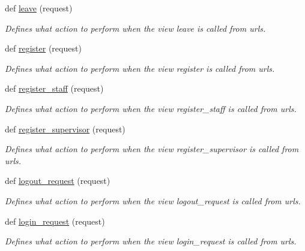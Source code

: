 \begin{DoxyCompactItemize}
def \hyperlink{namespacemain_1_1views_a0e05992f5c64ffb3cd35ddc581399e31}{leave} (request)
\begin{DoxyCompactList}\small\item\em Defines what action to perform when the view \textquotesingle{}leave\textquotesingle{} is called from urls. \end{DoxyCompactList}\item 
def \hyperlink{namespacemain_1_1views_a36b45d6ab9335da129aeab31c613726a}{register} (request)
\begin{DoxyCompactList}\small\item\em Defines what action to perform when the view \textquotesingle{}register\textquotesingle{} is called from urls. \end{DoxyCompactList}\item 
def \hyperlink{namespacemain_1_1views_afa83b35a6a0c354a6d9878bc3584aae4}{register\+\_\+staff} (request)
\begin{DoxyCompactList}\small\item\em Defines what action to perform when the view \textquotesingle{}register\+\_\+staff\textquotesingle{} is called from urls. \end{DoxyCompactList}\item 
def \hyperlink{namespacemain_1_1views_a26d1574cf1c0681b1589baf8f2840e4a}{register\+\_\+supervisor} (request)
\begin{DoxyCompactList}\small\item\em Defines what action to perform when the view \textquotesingle{}register\+\_\+supervisor\textquotesingle{} is called from urls. \end{DoxyCompactList}\item 
def \hyperlink{namespacemain_1_1views_a19ef1e1ff8dc4a8b7f24c011a69c56f5}{logout\+\_\+request} (request)
\begin{DoxyCompactList}\small\item\em Defines what action to perform when the view \textquotesingle{}logout\+\_\+request\textquotesingle{} is called from urls. \end{DoxyCompactList}\item 
def \hyperlink{namespacemain_1_1views_aa4b0b085bb5782a107fce5e03228e97b}{login\+\_\+request} (request)
\begin{DoxyCompactList}\small\item\em Defines what action to perform when the view \textquotesingle{}login\+\_\+request\textquotesingle{} is called from urls. \end{DoxyCompactList}\end{DoxyCompactItemize}


